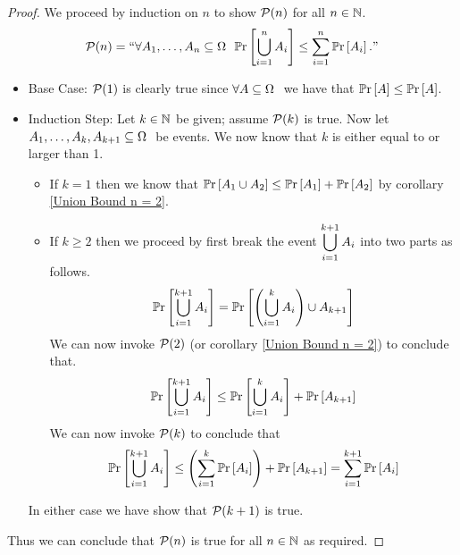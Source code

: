         \begin{proof}
            We proceed by induction on $n$ to show $\mathcal{P}(n)$ for all $n \in \mathbb{N}$.
            \[
                \mathcal{P}(n) = ``\forall A_1, \dots, A_n \subseteq \Omega \  \
                                     \mathbb{P}\mathrm{r} \left[\displaystyle\bigcup_{i = 1}^{n} A_i\right] \le \sum_{i = 1}^{n} \mathbb{P}\mathrm{r} \left[A_i\right]."
            \]
            \begin{itemize}
                \item
                    Base Case: $\mathcal{P}(1)$ is clearly true since $\forall A \subseteq \Omega \ $
                    we have that $\mathbb{P}\mathrm{r} \left[A\right] \le \mathbb{P}\mathrm{r} \left[A\right]$.
                \item
                    Induction Step: Let $k \in \mathbb{N}$ be given; assume $\mathcal{P}(k)$ is true.
                    Now let $A_1, \dots, A_k, A_{k + 1} \subseteq \Omega \ $ be events. We now know that
                    $k$ is either equal to or larger than 1.
                    \begin{itemize}
                        \item
                            If $k = 1$ then we know that $\mathbb{P}\mathrm{r} \left[A_1 \cup A_2\right] \le \mathbb{P}\mathrm{r} \left[A_1\right] + \mathbb{P}\mathrm{r} \left[A_2\right]$
                            by corollary \ref{Union Bound n = 2}.
                        \item
                            If $k \ge 2$ then we proceed by first break the event $\displaystyle\bigcup_{i = 1}^{k + 1} A_i$
                            into two parts as follows.
                            \[
                                \mathbb{P}\mathrm{r} \left[\displaystyle\bigcup_{i = 1}^{k + 1} A_i\right] = 
                                \mathbb{P}\mathrm{r} \left[\left(\displaystyle\bigcup_{i = 1}^{k} A_i\right) \cup A_{k + 1}\right]
                            \]
                            We can now invoke $\mathcal{P}(2)$ (or corollary \ref{Union Bound n = 2}) to
                            conclude that.
                            \[
                                \mathbb{P}\mathrm{r} \left[\displaystyle\bigcup_{i = 1}^{k + 1} A_i\right] \le
                                \mathbb{P}\mathrm{r} \left[\displaystyle\bigcup_{i = 1}^{k} A_i\right] + \mathbb{P}\mathrm{r} \left[A_{k + 1}\right]
                            \]
                            We can now invoke $\mathcal{P}(k)$ to conclude that
                            \[
                                \mathbb{P}\mathrm{r} \left[\displaystyle\bigcup_{i = 1}^{k + 1} A_i\right] \le
                                \left(\sum_{i = 1}^{k} \mathbb{P}\mathrm{r} \left[A_i\right]\right) + \mathbb{P}\mathrm{r} \left[A_{k + 1}\right] = \sum_{i = 1}^{k + 1} \mathbb{P}\mathrm{r} \left[A_i\right]
                            \]
                    \end{itemize}
                    In either case we have show that $\mathcal{P}(k + 1)$ is true.
            \end{itemize}
            Thus we can conclude that $\mathcal{P}(n)$ is true for all $n \in \mathbb{N}$
            as required. \QED
        \end{proof}
